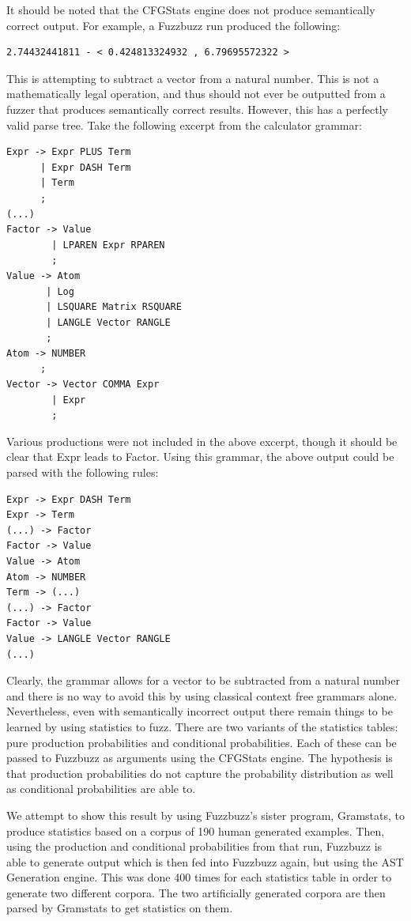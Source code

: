 It should be noted that the CFGStats engine does not produce semantically
correct output. For example, a Fuzzbuzz run produced the following:

\begin{verbatim}
2.74432441811 - < 0.424813324932 , 6.79695572322 >
\end{verbatim}

This is attempting to subtract a vector from a natural number. This is not a
mathematically legal operation, and thus should not ever be outputted from a
fuzzer that produces semantically correct results. However, this has a
perfectly valid parse tree. Take the following excerpt from the calculator
grammar:

\begin{verbatim}
Expr -> Expr PLUS Term
      | Expr DASH Term
      | Term
      ;
(...)
Factor -> Value
        | LPAREN Expr RPAREN
        ;
Value -> Atom
       | Log
       | LSQUARE Matrix RSQUARE
       | LANGLE Vector RANGLE
       ;
Atom -> NUMBER
      ;
Vector -> Vector COMMA Expr
        | Expr
        ;
\end{verbatim}

Various productions were not included in the above excerpt, though it should be
clear that Expr leads to Factor. Using this grammar, the above output could
be parsed with the following rules:

\begin{verbatim}
Expr -> Expr DASH Term
Expr -> Term
(...) -> Factor
Factor -> Value
Value -> Atom
Atom -> NUMBER
Term -> (...)
(...) -> Factor
Factor -> Value
Value -> LANGLE Vector RANGLE
(...)
\end{verbatim}

Clearly, the grammar allows for a vector to be subtracted from a natural number
and there is no way to avoid this by using classical context free grammars
alone. \\


Nevertheless, even with semantically incorrect output there remain things
to be learned by using statistics to fuzz. There are two variants of the
statistics tables: pure production probabilities and conditional probabilities.
Each of these can be passed to Fuzzbuzz as arguments using the CFGStats engine.
The hypothesis is that production probabilities do not capture the probability
distribution as well as conditional probabilities are able to.

We attempt to show this result by using Fuzzbuzz's sister program, Gramstats,
to produce statistics based on a corpus of 190 human generated examples. Then,
using the production and conditional probabilities from that run, Fuzzbuzz is
able to generate output which is then fed into Fuzzbuzz again, but using the AST
Generation engine. This was done 400 times for each statistics table in order to
generate two different corpora. The two artificially generated corpora are then
parsed by Gramstats to get statistics on them.

